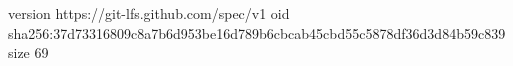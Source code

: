 version https://git-lfs.github.com/spec/v1
oid sha256:37d73316809c8a7b6d953be16d789b6cbcab45cbd55c5878df36d3d84b59c839
size 69
